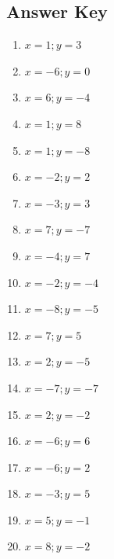 \documentclass{article}
\begin{document}
\newpage

\subsection*{Answer Key}

\begin{enumerate}
\item $\displaystyle x = 1 ; y = 3 $ \ 
\item $\displaystyle x = -6 ; y = 0 $ \ 
\item $\displaystyle x = 6 ; y = -4 $ \ 
\item $\displaystyle x = 1 ; y = 8 $ \ 
\item $\displaystyle x = 1 ; y = -8 $ \ 
\item $\displaystyle x = -2 ; y = 2 $ \ 
\item $\displaystyle x = -3 ; y = 3 $ \ 
\item $\displaystyle x = 7 ; y = -7 $ \ 
\item $\displaystyle x = -4 ; y = 7 $ \ 
\item $\displaystyle x = -2 ; y = -4 $ \ 
\item $\displaystyle x = -8 ; y = -5 $ \ 
\item $\displaystyle x = 7 ; y = 5 $ \ 
\item $\displaystyle x = 2 ; y = -5 $ \ 
\item $\displaystyle x = -7 ; y = -7 $ \ 
\item $\displaystyle x = 2 ; y = -2 $ \ 
\item $\displaystyle x = -6 ; y = 6 $ \ 
\item $\displaystyle x = -6 ; y = 2 $ \ 
\item $\displaystyle x = -3 ; y = 5 $ \ 
\item $\displaystyle x = 5 ; y = -1 $ \ 
\item $\displaystyle x = 8 ; y = -2 $ \ 

\end{enumerate}
\end{document}
